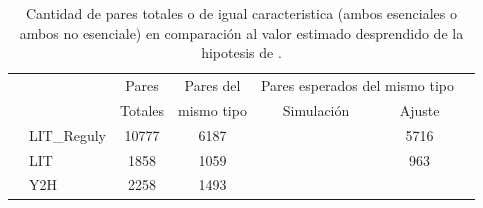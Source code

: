 \begin{table}[!ht]
    \centering
    \caption{\label{tab:pairs} Cantidad de pares totales o de igual caracteristica (ambos esenciales o ambos no esenciale)
    en comparaci\'on al valor estimado desprendido de la hipotesis de \citet{he2006}.}
    {\scriptsize
    \begin{tabularx}{.9\columnwidth}{XlccccX}
        \hline\hline
        &               & Pares   & Pares del   & \multicolumn{2}{c}{Pares esperados del mismo tipo }             \\ 
        \cline{5-6}
        &               & Totales & mismo tipo  & Simulaci\'on  &        Ajuste         &      \\
        \hline
        & LIT\_Reguly   & 10777   & 6187        &               &         5716          &               \\
        & LIT           & 1858    & 1059        &               &          963          &               \\
        & Y2H           & 2258    & 1493        &               &                       &               \\
        \hline\hline
    \end{tabularx}
    }
\end{table}
